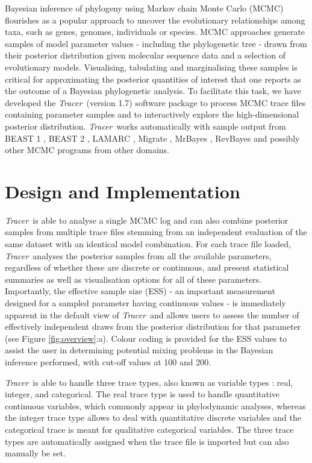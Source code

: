 \documentclass{bioinfo}
\newcommand{\tracer}{\emph{Tracer}}
\begin{document}
Bayesian inference of phylogeny using Markov chain Monte Carlo (MCMC) \citep{rannala1996probability, mau1999bayesian} flourishes as a popular approach to uncover the evolutionary relationships among taxa, such as genes, genomes, individuals or species.
MCMC approaches generate samples of model parameter values - including the phylogenetic tree - drawn from their posterior distribution given molecular sequence data and a selection of evolutionary models.
Visualising, tabulating and marginalising these samples is critical for approximating the posterior quantities of interest that one reports as the outcome of a Bayesian phylogenetic analysis.
To facilitate this task, we have developed the \tracer\ (version 1.7) software package to
process MCMC trace files containing parameter samples and to interactively explore the high-dimensional posterior distribution.
\tracer\ works automatically with sample output from BEAST 1 \citep{drummond2012bayesian}, BEAST 2 \citep{bouckaert2014beast2},  LAMARC \citep{kuhner2006lamarc},  Migrate \citep{beerli2006comparison}, MrBayes \citep{ronquist2012mrbayes}, RevBayes \citep{hohna2016revbayes} and possibly other MCMC programs from other domains.

\section*{Design and Implementation}

\tracer\ is able to analyse a single MCMC log and can also combine posterior samples from multiple trace files stemming from an independent evaluation of the same dataset with an identical model combination.
For each trace file loaded, \tracer\ analyses the posterior samples from all the available parameters, regardless of whether these are discrete or continuous, and present statistical summaries as well as visualisation options for all of these parameters.
Importantly, the effective sample size (ESS) - an important measurement designed for a sampled parameter having continuous values - is immediately apparent in the default view of \tracer\ and allows users to assess the number of effectively independent draws from the posterior distribution for that parameter (see Figure \ref{fig:overview}:a).
Colour coding is provided for the ESS values to assist the user in determining potential mixing problems in the Bayesian inference performed, with cut-off values at 100 and 200.

\tracer\ is able to handle three trace types, also known as variable types \citep{mendenhall2012introduction}: real, integer, and categorical.
The real trace type is used to handle quantitative continuous variables, which commonly appear in phylodynamic analyses, whereas the integer trace type allows to deal with quantitative discrete variables and the categorical trace is meant for qualitative categorical variables.
The three trace types are automatically assigned when the trace file is imported but can also manually be set.
\end{document}
